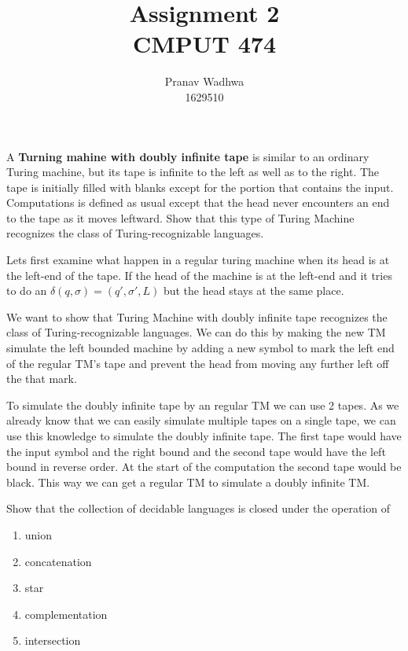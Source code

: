 \documentclass[12pt]{exam}
\title{
  Assignment 2\\
  \large CMPUT 474
}
\author{Pranav Wadhwa\\1629510}
\begin{document}
\maketitle
\noindent


\begin{questions}

  \question{} %
  A \textbf{Turning mahine with doubly infinite tape} is similar to an ordinary Turing machine, but its tape is infinite to the left as well as to the right.
  The tape is initially filled with blanks except for the portion that contains the input.
  Computations is defined as usual except that the head never encounters an end to the tape as it moves leftward.
  Show that this type of Turing Machine recognizes the class of Turing-recognizable languages.

  \begin{solution}
    Lets first examine what happen in a regular turing machine when its head is at the left-end of the tape.
    If the head of the machine is at the left-end and it tries to do an $\delta(q,\sigma) = (q',\sigma ', L)$ but the head stays at the same place.

    We want to show that Turing Machine with doubly infinite tape recognizes the class of Turing-recognizable languages.
    We can do this by making the new TM simulate the left bounded machine by adding a new symbol to mark the left end of the regular TM's tape and prevent the head from moving any further left off the that mark.

    To simulate the doubly infinite tape by an regular TM we can use 2 tapes. As we already know that we can easily simulate multiple tapes on a single tape, we can use this knowledge to simulate the doubly infinite tape.
    The first tape would have the input symbol and the right bound and the second tape would have the left bound in reverse order. At the start of the computation the second tape would be black.
    This way we can get a regular TM to simulate a doubly infinite TM.
  \end{solution}

  \question{}
  Show that the collection of decidable languages is closed under the operation of
  \begin{multicols}{2}
  \begin{enumerate}
    \item union
    \item concatenation
    \item star
    \item complementation
    \item intersection
  \end{enumerate}
  \end{multicols}


\end{questions}
\end{document}
